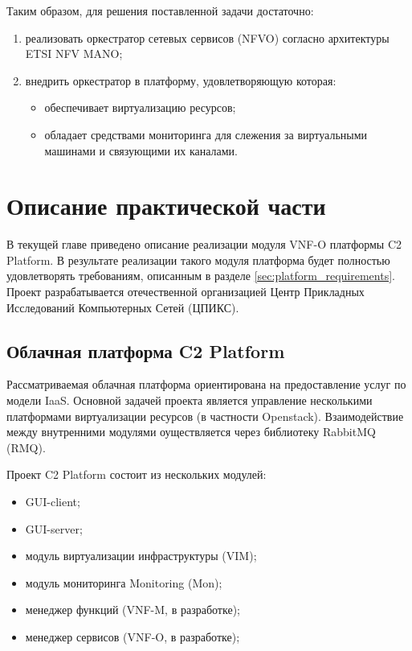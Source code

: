 \documentclass[oneside,final,14pt,a4paper]{extreport}
\begin{document}
Таким образом, для решения поставленной задачи достаточно:
\begin{enumerate}
	\item реализовать оркестратор сетевых сервисов (NFVO) согласно архитектуры ETSI NFV MANO;
	\item внедрить оркестратор в платформу, удовлетворяющую которая:
	\begin{itemize}
		\item обеспечивает виртуализацию ресурсов;
		\item обладает средствами мониторинга для слежения за виртуальными машинами и связующими их каналами.
	\end{itemize}
\end{enumerate}





\chapter{Описание практической части}
\label{chap:practice}
В текущей главе приведено описание реализации модуля VNF-O платформы C2 Platform. В результате реализации такого модуля платформа будет полностью удовлетворять требованиям, описанным в разделе \ref{sec:platform_requirements}. Проект разрабатывается отечественной организацией Центр Прикладных Исследований Компьютерных Сетей (ЦПИКС).

\section{Облачная платформа C2 Platform}
\label{sec:c2-platform-description}
Рассматриваемая облачная платформа ориентирована на предоставление услуг по модели IaaS. Основной задачей проекта является управление несколькими платформами виртуализации ресурсов (в частности Openstack). Взаимодействие между внутренними модулями оуществляется через библиотеку RabbitMQ (RMQ). \cite{bib:rabbitmq}

Проект C2 Platform состоит из нескольких модулей:
\begin{itemize}
	\item GUI-client;
	\item GUI-server;
	\item модуль виртуализации инфраструктуры (VIM);
	\item модуль мониторинга Monitoring (Mon);
	\item менеджер функций (VNF-M, в разработке);
	\item менеджер сервисов (VNF-O, в разработке);
\end{itemize}
\end{document}
